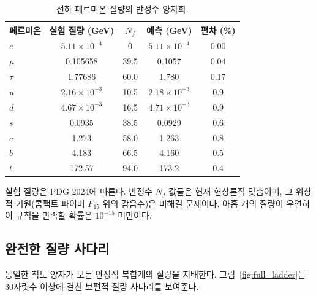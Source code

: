 \documentclass[12pt,a4paper]{article}
\theoremstyle{remark}
\begin{document}
	\begin{table}[htbp]
		\centering
		\caption{전하 페르미온 질량의 반정수 양자화.}
		\label{tab:fermions}
		\small
		\begin{tabular}{l c c c c}
			\toprule
			페르미온 & 실험 질량 (GeV) & \(N_f\) & 예측 (GeV) & 편차 (\%) \\
			\midrule
			\(e\)   & \(5.11\times10^{-4}\) & 0      & \(5.11\times10^{-4}\) & 0.00 \\
			\(\mu\)  & 0.105658             & 39.5   & 0.1057               & 0.04 \\
			\(\tau\) & 1.77686              & 60.0   & 1.780                & 0.17 \\
			\(u\)   & \(2.16\times10^{-3}\) & 10.5   & \(2.18\times10^{-3}\) & 0.9 \\
			\(d\)   & \(4.67\times10^{-3}\) & 16.5   & \(4.71\times10^{-3}\) & 0.9 \\
			\(s\)   & 0.0935               & 38.5   & 0.0929               & 0.6 \\
			\(c\)   & 1.273                & 58.0   & 1.263                & 0.8 \\
			\(b\)   & 4.183                & 66.5   & 4.160                & 0.5 \\
			\(t\)   & 172.57               & 94.0   & 173.2                & 0.4 \\
			\bottomrule
		\end{tabular}
		\par\smallskip
		\footnotesize
		실험 질량은 PDG 2024에 따른다. 반정수 \(N_f\) 값들은 현재 현상론적 맞춤이며, 그 위상적 기원(콤팩트 파이버 \(F_{15}\) 위의 감음수)은 미해결 문제이다. 아홉 개의 질량이 우연히 이 규칙을 만족할 확률은 \(10^{-15}\) 미만이다.
	\end{table}
	
	\subsection{완전한 질량 사다리}
	
	동일한 척도 양자가 모든 안정적 복합계의 질량을 지배한다. 그림~\ref{fig:full_ladder}는 30자릿수 이상에 걸친 보편적 질량 사다리를 보여준다.
	
\end{document}

